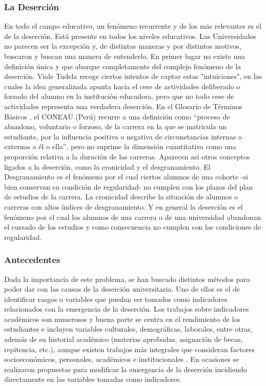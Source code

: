 \subsubsection{La Deserción}\label{seccion:desercion}
En todo el campo educativo, un fenómeno recurrente y de los más relevantes es el de la deserción. Está presente en todos los niveles educativos. Las Universidades no parecen ser la excepción y, de distintas maneras y por distintos motivos, buscaron y buscan una manera de entenderlo. En primer lugar no existe una definición única y que abarque completamente del complejo fenómeno de la deserción.  
Viale Tudela \cite{ErnestoUNAOUT} recoge ciertos intentos de captar estas "intuiciones", en las cuales la idea generalizada apunta hacia el cese de actividades deliberado o forzado del alumno en la institución educadora, pero que no todo cese de actividades representa una
verdadera deserción. En el Glosario de Términos Básicos \cite{CONEAU2010PropuestaSINEACE}, el CONEAU (Perú) recurre a una definición como “proceso de abandono, voluntario o forzoso, de la carrera en la que se matricula un estudiante, por la influencia positiva o negativa de circunstancias internas o externas a él o ella”, pero no suprime la dimensión cuantitativa como una proporción relativa a la duración de las carreras. Aparecen así otros conceptos ligados a la deserción, como la cronicidad y el desgranamiento. El Desgranamiento es el fenómeno por el cual ciertos alumnos de una cohorte -si bien conservan su condición de regularidad- no cumplen con los plazos del plan de estudios de la carrera. La cronicidad describe la situación de alumnos o carreras con altos índices de desgranamiento. Y en general la deserción es el fenómeno por el cual los alumnos de una carrera o de una universidad abandonan el cursado de los estudios y como consecuencia no cumplen con las  condiciones de regularidad.

\subsubsection{Antecedentes}
Dada la importancia de este problema, se han buscado distintos métodos para poder dar con  las causas de la deserción universitaria. Uno de ellos es el de identificar rasgos o variables que puedan ser tomados como indicadores relacionados con la emergencia de la deserción. Los trabajos sobre indicadores académicos son numerosos y buena parte se centra en el rendimiento de los estudiantes e incluyen variables culturales, demográficas, laborales, entre otras, además de su historial académico (materias aprobadas, asignación de becas, repitencia, etc.), aunque existen trabajos más integrales que consideran factores socioeconómicos, personales, académicos e institucionales \cite{L.GonzalezFeigehen2006RepitenciaLatina,SociedadModeloSuperior}.
En ocasiones se realizaron propuestas \cite{Kuna2009IdentificacionUniversitarios} para modificar la emergencia de la deserción incidiendo directamente en las variables tomadas como indicadores.




